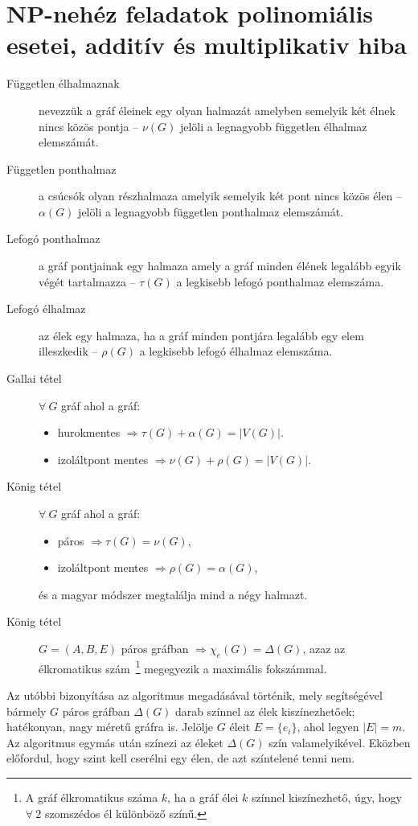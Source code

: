 \section{NP-nehéz feladatok polinomiális esetei, additív és multiplikativ hiba}

\begin{description}
	\item[Független élhalmaznak] nevezzük a gráf éleinek egy olyan halmazát
	      amelyben semelyik két élnek nincs közös pontja -- $\nu(G)$ jelöli a legnagyobb
	      független élhalmaz elemszámát.
	\item[Független ponthalmaz]  a csúcsók olyan részhalmaza amelyik semelyik két
	      pont nincs közös élen -- $\alpha(G)$ jelöli a legnagyobb független ponthalmaz
	      elemszámát.
	\item[Lefogó ponthalmaz] a gráf pontjainak egy halmaza amely a gráf minden
	      élének legalább egyik végét tartalmazza -- $\tau(G)$ a legkisebb lefogó
	      ponthalmaz elemszáma.
	\item[Lefogó élhalmaz] az élek egy halmaza, ha a gráf minden pontjára legalább
	      egy elem illeszkedik -- $\rho(G)$ a legkisebb lefogó élhalmaz elemszáma.
	\item[Gallai tétel] $\forall~G$ gráf ahol a gráf: \begin{itemize}
		      \item hurokmentes $\Rightarrow \tau(G)+\alpha(G) = |V(G)|$.
		      \item izoláltpont mentes $\Rightarrow \nu(G) +\rho(G) = |V(G)|$.
	      \end{itemize}
	\item[König tétel] $\forall~G$ gráf ahol a gráf: \begin{itemize}
		      \item páros $\Rightarrow \tau(G)=\nu(G)$,
		      \item izoláltpont mentes $\Rightarrow \rho(G) = \alpha(G)$,
	      \end{itemize}
	      és a magyar módszer megtalálja mind a négy halmazt.
	\item[König tétel] $G=(A,B,E)$ páros gráfban $\Rightarrow \chi_e(G) =
		      \Delta(G)$, azaz az élkromatikus szám~\footnote{A gráf élkromatikus száma
		      $k$, ha a gráf élei $k$  színnel kiszínezhető, úgy, hogy $\forall~2$
		      szomszédos él különböző színű. } megegyezik a maximális fokszámmal.
\end{description}

Az utóbbi bizonyítása az algoritmus megadásával történik, mely segítségével
bármely $G$ páros gráfban $\Delta(G)$ darab színnel az élek kiszínezhetőek;
hatékonyan, nagy méretű gráfra is. Jelölje $G$ éleit $E=\{ e_i \}$, ahol legyen
$|E|=m$. Az algoritmus egymás után színezi az éleket $\Delta(G)$ szín valamelyikével.
Eközben előfordul, hogy szint kell cserélni egy élen, de azt színtelené tenni nem.

